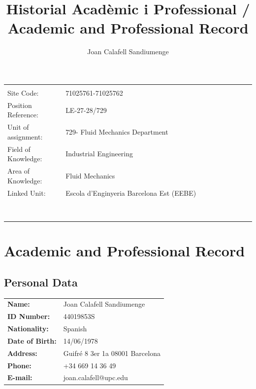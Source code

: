 \documentclass{article}
\title{{\bf Historial Acadèmic i Professional / \\ Academic and Professional Record}}
\date{}
\author{\Large Joan Calafell Sandiumenge}
\begin{document}
\maketitle


\thispagestyle{firststyle}

\vspace{1.0cm}

\begin{tabular}{ l l }
\hline \\
 Site Code:          & 71025761-71025762  \\ 
 Position Reference: & LE-27-28/729 \\
 Unit of assignment: & 729- Fluid Mechanics Department  \\  
 Field of Knowledge: & Industrial Engineering \\
 Area of Knowledge:  & Fluid Mechanics \\   
 Linked Unit:        & Escola d’Enginyeria Barcelona Est (EEBE)\\
  $\ $               & $\quad $$\quad $$\quad $$\quad $$\quad $$\quad $$\quad $$\quad $$\quad $$\quad $$\quad $$\quad $$\quad $$\quad $$\quad $$\quad $$\quad $$\quad $$\quad $$\quad $$\quad $$\quad $$\quad $$\quad $$\quad $$\quad $$\quad $$\quad $$\quad $$\quad $$\quad $$\quad $$\quad $$\quad $$\quad $$\quad $$\quad $$\quad $\\
 \hline
\end{tabular}

\newpage

\tableofcontents

\newpage

\section{Academic and Professional Record}
\subsection{Personal Data}

\vspace{0.5cm}

\begin{tabular}{ l l }
 {\bf Name:}               & Joan Calafell Sandiumenge  \\ 
 {\bf ID Number:}          & 44019853S \\
 {\bf Nationality:}        & Spanish  \\  
 {\bf Date of Birth:}      & 14/06/1978 \\
 {\bf Address:}            & Guifré 8 3er 1a 08001 Barcelona \\   
 {\bf Phone:}              & +34 669 14 36 49\\
 {\bf E-mail:}             & joan.calafell@upc.edu\\
\end{tabular}
\end{document}
